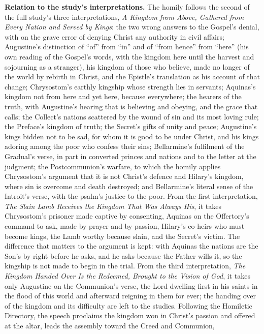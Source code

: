 {\textbf{Relation to the study's interpretations.} The homily follows the
second of the full study's three interpretations, \textit{A Kingdom from
Above, Gathered from Every Nation and Served by Kings}: the two wrong answers
to the Gospel's denial, with  on the grave error of denying
Christ any authority in civil affairs; Augustine's distinction of ``of'' from
``in'' and of ``from hence'' from ``here'' (his own reading of the Gospel's
words, with the kingdom here until the harvest and sojourning as a stranger),
his kingdom of those who believe, made no longer of the world by rebirth in
Christ, and the Epistle's translation as his account of that change;
Chrysostom's earthly kingship whose strength lies in servants; Aquinas's
kingdom not from here and yet here, because everywhere; the hearers of the truth,
with Augustine's hearing that is believing and obeying, and the grace that
calls; the Collect's nations scattered by the wound of sin and its most loving
rule; the Preface's kingdom of truth; the Secret's gifts of unity and peace;
Augustine's kings bidden not to be sad, for whom it is good to be under
Christ, and his kings adoring among the poor who confess their sins;
Bellarmine's fulfilment of the Gradual's verse, in part in converted princes
and nations and to the letter at the judgment; the Postcommunion's
warfare, to which the homily applies Chrysostom's argument that it is not
Christ's defence and Hilary's kingdom, where sin is overcome and death
destroyed; and Bellarmine's literal sense of the Introit's verse, with the
psalm's justice to the poor. From the first interpretation, \textit{The Slain
Lamb Receives the Kingdom That Was Always His}, it takes Chrysostom's prisoner
made captive by consenting, Aquinas on the Offertory's command to ask, made by
prayer and by passion, Hilary's co-heirs who must become kings, the Lamb
worthy because slain, and the Secret's victim. The difference that matters to
the argument is kept: with Aquinas the nations are the Son's by right before
he asks, and he asks because the Father wills it, so the kingship is not made
to begin in the trial. From the third interpretation, \textit{The Kingdom
Handed Over Is the Redeemed, Brought to the Vision of God}, it takes only
Augustine on the Communion's verse, the Lord dwelling first in his saints in
the flood of this world and afterward reigning in them for ever; the handing
over of the kingdom and its difficulty are left to the studies. Following the
Homiletic Directory, the speech proclaims the kingdom won in Christ's passion
and offered at the altar, leads the assembly toward the Creed and Communion,
}
